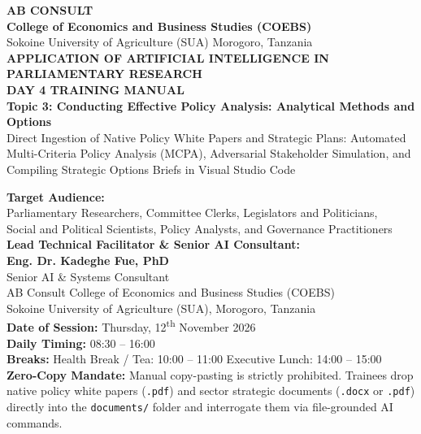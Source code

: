 \documentclass[11pt, a4paper]{report}
\begin{document}
\begin{titlepage}
    \centering
    \vspace*{0.5cm}
    
    {\LARGE \textbf{\textcolor{tanzaniablue}{AB CONSULT}}}\\[0.2cm]
    {\large \textbf{College of Economics and Business Studies (COEBS)}}\\[0.15cm]
    {\normalsize Sokoine University of Agriculture (SUA) \textbullet{} Morogoro, Tanzania}\\[1.2cm]
    
    {\LARGE \textbf{\textcolor{suagreen}{APPLICATION OF ARTIFICIAL INTELLIGENCE IN PARLIAMENTARY RESEARCH}}}\\[0.4cm]
    {\Huge \textbf{DAY 4 TRAINING MANUAL}}\\[0.4cm]
    {\Large \textbf{Topic 3: Conducting Effective Policy Analysis: Analytical Methods and Options}}\\[0.25cm]
    {\large Direct Ingestion of Native Policy White Papers and Strategic Plans: Automated Multi-Criteria Policy Analysis (MCPA), Adversarial Stakeholder Simulation, and Compiling Strategic Options Briefs in Visual Studio Code}\\[1.2cm]
    
    \begin{minipage}{0.92\textwidth}
        \centering
        \textbf{Target Audience:}\\
        Parliamentary Researchers, Committee Clerks, Legislators and Politicians,\\
        Social and Political Scientists, Policy Analysts, and Governance Practitioners\\[0.6cm]
        
        \textbf{Lead Technical Facilitator \& Senior AI Consultant:}\\
        \textbf{\Large Eng. Dr. Kadeghe Fue, PhD}\\
        Senior AI \& Systems Consultant\\
        AB Consult \textbullet{} College of Economics and Business Studies (COEBS)\\
        Sokoine University of Agriculture (SUA), Morogoro, Tanzania\\[0.6cm]
        
        \textbf{Date of Session:} Thursday, 12\textsuperscript{th} November 2026\\
        \textbf{Daily Timing:} 08:30 -- 16:00\\
        \textbf{Breaks:} Health Break / Tea: 10:00 -- 11:00 \textbar{} Executive Lunch: 14:00 -- 15:00\\
        \textbf{Zero-Copy Mandate:} Manual copy-pasting is strictly prohibited. Trainees drop native policy white papers (\texttt{.pdf}) and sector strategic documents (\texttt{.docx} or \texttt{.pdf}) directly into the \texttt{documents/} folder and interrogate them via file-grounded AI commands.
    \end{minipage}
    

\end{titlepage}
\end{document}
